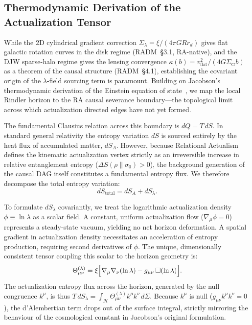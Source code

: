 \documentclass[11pt,a4paper]{article}
\theoremstyle{plain}
\theoremstyle{definition}
\theoremstyle{remark}
\begin{document}
\begin{description}
\subsection{Thermodynamic Derivation of the Actualization Tensor}
\label{sec:thermo_derivation}

While the 2D cylindrical gradient correction
$\Sigma_\lambda = \xi/(4\pi G R r_d)$ gives flat galactic rotation curves
in the disk regime (RADM~\S3.1, RA-native), and the DJW sparse-halo regime
gives the lensing convergence $\kappa(b) = v_\mathrm{flat}^2/(4G\Sigma_\mathrm{cr}b)$
as a theorem of the causal structure (RADM~\S4.1), establishing the covariant
origin of the $\lambda$-field sourcing term is paramount. Building on Jacobson's thermodynamic derivation of the Einstein
equation of state~\citep{Jacobson1995}, we map the local Rindler horizon to the
RA causal severance boundary---the topological limit across which actualization
directed edges have not yet formed.

The fundamental Clausius relation across this boundary is $dQ = T\,dS$. In
standard general relativity the entropy variation $dS$ is sourced entirely by the
heat flux of accumulated matter, $dS_A$. However, because Relational Actualism
defines the kinematic actualization vertex strictly as an irreversible increase in
relative entanglement entropy ($\Delta S(\rho\|\sigma_0) > 0$), the background
generation of the causal DAG itself constitutes a fundamental entropy flux. We
therefore decompose the total entropy variation:
\begin{equation}
  dS_{\mathrm{total}} = dS_A + dS_\lambda.
\end{equation}

To formulate $dS_\lambda$ covariantly, we treat the logarithmic actualization
density $\phi \equiv \ln\lambda$ as a scalar field. A constant, uniform
actualization flow ($\nabla_\mu\phi = 0$) represents a steady-state vacuum,
yielding no net horizon deformation. A spatial gradient in actualization density
necessitates an acceleration of entropy production, requiring second derivatives
of $\phi$. The unique, dimensionally consistent tensor coupling this scalar to
the horizon geometry is:
\begin{equation}
  \Theta_{\mu\nu}^{(\lambda)} = \xi
    \Bigl[\nabla_\mu\nabla_\nu(\ln\lambda)
          - g_{\mu\nu}\,\Box(\ln\lambda)\Bigr].
  \label{eq:actualization_tensor}
\end{equation}
The actualization entropy flux across the horizon, generated by the null
congruence $k^\mu$, is thus
$T\,dS_\lambda = \int_{\mathcal{H}} \Theta_{\mu\nu}^{(\lambda)}k^\mu k^\nu\,d\Sigma$.
Because $k^\mu$ is null ($g_{\mu\nu}k^\mu k^\nu = 0$), the d'Alembertian term
drops out of the surface integral, strictly mirroring the behaviour of the
cosmological constant in Jacobson's original formulation.


\end{description}
\end{document}
